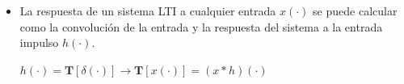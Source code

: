 \begin{frame}
\begin{itemize}
\begin{itemize}
\vspace{0,2cm}
\end{itemize}


\item <3-> \small La respuesta de un  sistema LTI a cualquier entrada $x(\cdot)$ se puede calcular como la convolución de la entrada y la respuesta del sistema a la entrada impulso $h(\cdot)$.

\vspace{0,1cm}

\hspace{2cm} \alert{$h(\cdot)=\bm{T}[\delta(\cdot)]  \rightarrow  \bm{T}[x(\cdot)]=(x* h)(\cdot)$}


\end{itemize}


\end{frame}



